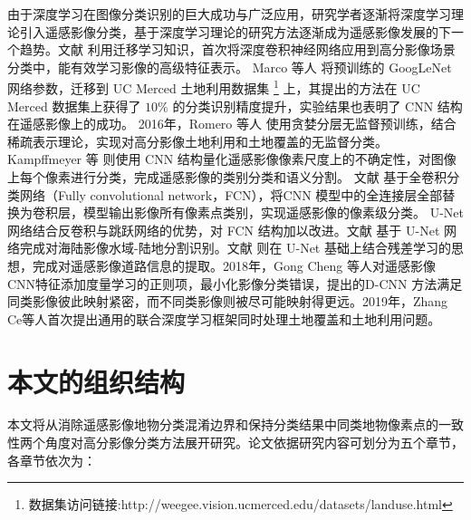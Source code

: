 % 

由于深度学习在图像分类识别的巨大成功与广泛应用，研究学者逐渐将深度学习理论引入遥感影像分类，基于深度学习理论的研究方法逐渐成为遥感影像发展的下一个趋势。文献 \cite{hu2015transferring} 利用迁移学习知识，首次将深度卷积神经网络应用到高分影像场景分类中，能有效学习影像的高级特征表示。 Marco 等人 \cite{castelluccio2015land} 将预训练的 GoogLeNet 网络参数，迁移到 UC Merced 土地利用数据集 \footnote{数据集访问链接:http://weegee.vision.ucmerced.edu/datasets/landuse.html} 上，其提出的方法在 UC Merced 数据集上获得了 $10\%$ 的分类识别精度提升，实验结果也表明了 CNN 结构在遥感影像上的成功。 2016年，Romero 等人 \cite{romero2016unsupervised} 使用贪婪分层无监督预训练，结合稀疏表示理论，实现对高分影像土地利用和土地覆盖的无监督分类。 Kampffmeyer 等 \cite{kampffmeyer2016semantic} 则使用 CNN 结构量化遥感影像像素尺度上的不确定性，对图像上每个像素进行分类，完成遥感影像的类别分类和语义分割。 文献 \cite{maggiori2016fully} 基于全卷积分类网络（Fully convolutional network，FCN），将CNN 模型中的全连接层全部替换为卷积层，模型输出影像所有像素点类别，实现遥感影像的像素级分类。 U-Net \cite{ronneberger2015u} 网络结合反卷积与跳跃网络的优势，对 FCN 结构加以改进。文献 \cite{li2018deepunet} 基于 U-Net 网络完成对海陆影像水域-陆地分割识别。文献 \cite{zhang2018road} 则在 U-Net 基础上结合残差学习的思想，完成对遥感影像道路信息的提取。2018年，Gong Cheng\cite{8252784} 等人对遥感影像CNN特征添加度量学习的正则项，最小化影像分类错误，提出的D-CNN 方法满足同类影像彼此映射紧密，而不同类影像则被尽可能映射得更远。2019年，Zhang Ce\cite{zhang2019joint}等人首次提出通用的联合深度学习框架同时处理土地覆盖和土地利用问题。



\section{本文的组织结构}
\label{sec:third}
本文将从消除遥感影像地物分类混淆边界和保持分类结果中同类地物像素点的一致性两个角度对高分影像分类方法展开研究。论文依据研究内容可划分为五个章节，各章节依次为：

